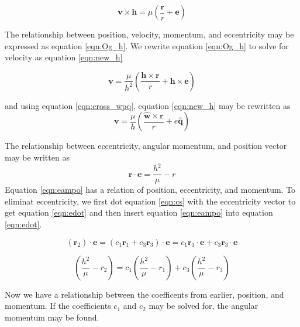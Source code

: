 \documentclass[12pt]{article}
\begin{document}
	\begin{equation}
	\mathbf { v } \times \mathbf { h } = \mu \left( \frac { \mathbf { r } } { r } + \mathbf { e } \right)
	\label{eqn:Og_h}
	\end{equation}
	
	The relationship between position, velocity, momentum, and eccentricity may be expressed as equation \ref{eqn:Og_h}. We rewrite equation \ref{eqn:Og_h} to solve for velocity as equation \ref{eqn:new_h}
	
	\begin{equation}
	\mathbf { v } = \frac { \mu } { h ^ { 2 } } \left( \frac { \mathbf { h } \times \mathbf { r } } { r } + \mathbf { h } \times \mathbf { e } \right)
	\label{eqn:new_h}
	\end{equation}

	
		and using equation \ref{eqn:cross_wpq}, equation \ref{eqn:new_h} may be rewritten as
	 \begin{equation}
	 \mathbf { v } = \frac { \mu } { h } \left( \frac { \hat { \mathbf { w } } \times \mathbf { r } } { r } + e \hat { \mathbf { q } } \right)
	 \end{equation}
	 
	 The relationship between eccentricity, angular momentum, and position vector may be written as 
	 \begin{equation}
	 \mathbf { r } \cdot \mathbf { e } = \frac { h ^ { 2 } } { \mu } - r 
	 \label{eqn:eampo}
	 \end{equation}
	 Equation \ref{eqn:eampo} has a relation of position, eccentricity, and momentum. To eliminat eccentricity, we first dot equation \ref{eqn:cs} with the eccentricity vector to get equation \ref{eqn:edot} and then insert equation \ref{eqn:eampo} into equation \ref{eqn:edot}.
	 
	 \begin{equation}
	 \left(\mathbf{r}_2 \right)\cdot\mathbf{ e }= \left(c_1 \mathbf{ r }_1 + c_3 \mathbf{r}_3\right)\cdot\mathbf{ e }=c_1 \mathbf{ r }_1\cdot\mathbf{ e } + c_3 \mathbf{r}_3\cdot\mathbf{ e }
	 \label{eqn:edot}
	 \end{equation}
	 
	 
	 \begin{equation}
	 \left(\frac { h ^ { 2 } } { \mu } - r_2\right) =c_1 \left(\frac { h ^ { 2 } } { \mu } - r_1\right)  + c_3\left(\frac { h ^ { 2 } } { \mu } - r _3\right)
	 \label{eqn:edot2}
	 \end{equation}
	 
	 Now we have a relationship between the coefficents from earlier, position, and momentum. If the coefficients $c_1$ and $c_2$ may be solved for, the angular momentum may be found. 
	 
\end{document}
